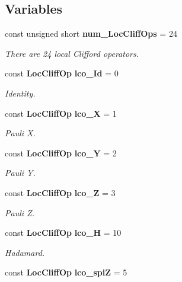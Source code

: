 \subsection*{Variables}
\begin{CompactItemize}
\item 
const  unsigned short {\bf num\_\-Loc\-Cliff\-Ops} = 24\label{loccliff_8h_a0}

\begin{CompactList}\small\item\em There are 24 local Clifford operators. \item\end{CompactList}\item 
const  {\bf Loc\-Cliff\-Op} {\bf lco\_\-Id} = 0\label{loccliff_8h_a1}

\begin{CompactList}\small\item\em Identity. \item\end{CompactList}\item 
const  {\bf Loc\-Cliff\-Op} {\bf lco\_\-X} = 1\label{loccliff_8h_a2}

\begin{CompactList}\small\item\em Pauli X. \item\end{CompactList}\item 
const  {\bf Loc\-Cliff\-Op} {\bf lco\_\-Y} = 2\label{loccliff_8h_a3}

\begin{CompactList}\small\item\em Pauli Y. \item\end{CompactList}\item 
const  {\bf Loc\-Cliff\-Op} {\bf lco\_\-Z} = 3\label{loccliff_8h_a4}

\begin{CompactList}\small\item\em Pauli Z. \item\end{CompactList}\item 
const  {\bf Loc\-Cliff\-Op} {\bf lco\_\-H} = 10\label{loccliff_8h_a5}

\begin{CompactList}\small\item\em Hadamard. \item\end{CompactList}\item 
const  {\bf Loc\-Cliff\-Op} {\bf lco\_\-spi\-Z} = 5\label{loccliff_8h_a6}


\end{CompactItemize}
